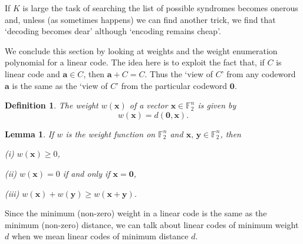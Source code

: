 \documentclass[12pt,a4paper]{article}
\theoremstyle{plain}
\newtheorem{lemma}[theorem]{Lemma}
\newtheorem{definition}[theorem]{Definition}
\theoremstyle{definition}
\begin{document}
    If $K$ is large the task of searching the list
    of possible syndromes becomes onerous and,
    unless (as sometimes happens) we can find
    another trick,
    we find that `decoding becomes dear'
    although `encoding remains cheap'.

    We conclude this section by looking at weights
    and the
    weight enumeration polynomial for a linear code.
    The idea here is to exploit the fact that, if
    $C$ is linear code and ${\mathbf a}\in C$,
    then ${\mathbf a}+C=C$. Thus the `view of $C$'
    from any codeword ${\mathbf a}$ is the same
    as the `view of $C$' from the particular codeword
    ${\boldsymbol 0}$.
    \begin{definition}
        The \emph{weight} $w({\mathbf x})$
        of a vector ${\mathbf x}\in{\mathbb F}_{2}^{n}$
        is given by
        \[w({\mathbf x})=d({\boldsymbol 0},{\mathbf x}).\]
    \end{definition}
    \begin{lemma}
        If $w$ is the weight function on
        ${\mathbb F}_{2}^{n}$ and
        ${\mathbf x},\,{\mathbf y}\in{\mathbb F}_{2}^{n}$,
        then

        (i) $w({\mathbf x})\geq 0$,

        (ii) $w({\mathbf x})=0$ if and only if
        ${\mathbf x}={\boldsymbol 0}$,

        (iii) $w({\mathbf x})+w({\mathbf y})\geq
        w({\mathbf x}+{\mathbf y})$.
    \end{lemma}

    Since the minimum (non-zero) weight in a linear code
    is the same as the minimum (non-zero)
    distance, we can talk
    about linear codes of minimum weight $d$
    when we mean linear codes of minimum distance $d$.
\end{document}

